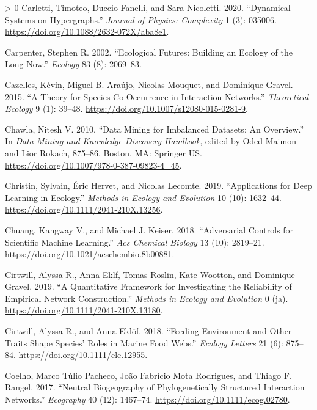 \documentclass[10pt,oneside]{article}
\newlength{\cslhangindent}
\newenvironment{CSLReferences}[3] %
 {%
  \setlength{\parindent}{0pt}
  \ifodd #1 \everypar{\setlength{\hangindent}{\cslhangindent}}\ignorespaces\fi
  \ifnum #2 > 0
  \setlength{\parskip}{#2\baselineskip}
  \fi
 }%
 {}
\begin{document}
\begin{CSLReferences}{1}{0}
\leavevmode\hypertarget{ref-Carletti2020DynSys}{}%
Carletti, Timoteo, Duccio Fanelli, and Sara Nicoletti. 2020.
{``Dynamical Systems on Hypergraphs.''} \emph{Journal of Physics:
Complexity} 1 (3): 035006.
\url{https://doi.org/10.1088/2632-072X/aba8e1}.

\leavevmode\hypertarget{ref-Carpenter2002EcoFut}{}%
Carpenter, Stephen R. 2002. {``Ecological Futures: Building an Ecology
of the Long Now.''} \emph{Ecology} 83 (8): 2069--83.

\leavevmode\hypertarget{ref-Cazelles2015TheSpe}{}%
Cazelles, Kévin, Miguel B. Araújo, Nicolas Mouquet, and Dominique
Gravel. 2015. {``A Theory for Species Co-Occurrence in Interaction
Networks.''} \emph{Theoretical Ecology} 9 (1): 39--48.
\url{https://doi.org/10.1007/s12080-015-0281-9}.

\leavevmode\hypertarget{ref-Chawla2010DatMin}{}%
Chawla, Nitesh V. 2010. {``Data Mining for Imbalanced Datasets: An
Overview.''} In \emph{Data Mining and Knowledge Discovery Handbook},
edited by Oded Maimon and Lior Rokach, 875--86. Boston, MA: Springer US.
\url{https://doi.org/10.1007/978-0-387-09823-4_45}.

\leavevmode\hypertarget{ref-Christin2019AppDee}{}%
Christin, Sylvain, Éric Hervet, and Nicolas Lecomte. 2019.
{``Applications for Deep Learning in Ecology.''} \emph{Methods in
Ecology and Evolution} 10 (10): 1632--44.
\url{https://doi.org/10.1111/2041-210X.13256}.

\leavevmode\hypertarget{ref-Chuang2018AdvCon}{}%
Chuang, Kangway V., and Michael J. Keiser. 2018. {``Adversarial Controls
for Scientific Machine Learning.''} \emph{Acs Chemical Biology} 13 (10):
2819--21. \url{https://doi.org/10.1021/acschembio.8b00881}.

\leavevmode\hypertarget{ref-Cirtwill2019QuaFra}{}%
Cirtwill, Alyssa R., Anna Eklf, Tomas Roslin, Kate Wootton, and
Dominique Gravel. 2019. {``A Quantitative Framework for Investigating
the Reliability of Empirical Network Construction.''} \emph{Methods in
Ecology and Evolution} 0 (ja).
\url{https://doi.org/10.1111/2041-210X.13180}.

\leavevmode\hypertarget{ref-Cirtwill2018FeeEnv}{}%
Cirtwill, Alyssa R., and Anna Eklöf. 2018. {``Feeding Environment and
Other Traits Shape Species' Roles in Marine Food Webs.''} \emph{Ecology
Letters} 21 (6): 875--84. \url{https://doi.org/10.1111/ele.12955}.

\leavevmode\hypertarget{ref-Coelho2017NeuBio}{}%
Coelho, Marco Túlio Pacheco, João Fabrício Mota Rodrigues, and Thiago F.
Rangel. 2017. {``Neutral Biogeography of Phylogenetically Structured
Interaction Networks.''} \emph{Ecography} 40 (12): 1467--74.
\url{https://doi.org/10.1111/ecog.02780}.


\end{CSLReferences}
\end{document}
